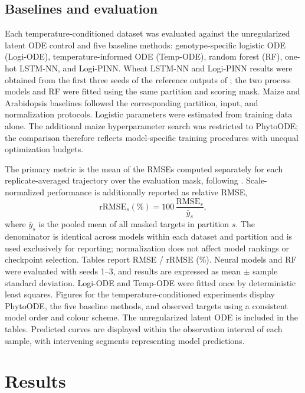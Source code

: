\documentclass[preprint,12pt,authoryear]{elsarticle}
\begin{document}
\subsection{Baselines and evaluation}

Each temperature-conditioned dataset was evaluated against the unregularized latent ODE control and five baseline methods: genotype-specific logistic ODE (Logi-ODE), temperature-informed ODE (Temp-ODE), random forest (RF), one-hot LSTM-NN, and Logi-PINN. Wheat LSTM-NN and Logi-PINN results were obtained from the first three seeds of the reference outputs of \citet{shao2026pinn}; the two process models and RF were fitted using the same partition and scoring mask. Maize and Arabidopsis baselines followed the corresponding partition, input, and normalization protocols. Logistic parameters were estimated from training data alone. The additional maize hyperparameter search was restricted to PhytoODE; the comparison therefore reflects model-specific training procedures with unequal optimization budgets.

The primary metric is the mean of the RMSEs computed separately for each replicate-averaged trajectory over the evaluation mask, following \citet{shao2026pinn}. Scale-normalized performance is additionally reported as relative RMSE,
\begin{equation}
 \mathrm{rRMSE}_s(\%)=100\,\frac{\mathrm{RMSE}_s}{\bar y_s},
 \label{eq:rrmse}
\end{equation}
where $\bar y_s$ is the pooled mean of all masked targets in partition $s$. The denominator is identical across models within each dataset and partition and is used exclusively for reporting; normalization does not affect model rankings or checkpoint selection. Tables report RMSE / rRMSE (\%). Neural models and RF were evaluated with seeds 1--3, and results are expressed as mean $\pm$ sample standard deviation. Logi-ODE and Temp-ODE were fitted once by deterministic least squares. Figures for the temperature-conditioned experiments display PhytoODE, the five baseline methods, and observed targets using a consistent model order and colour scheme. The unregularized latent ODE is included in the tables. Predicted curves are displayed within the observation interval of each sample, with intervening segments representing model predictions.




\section{Results}
\label{sec:results}
\end{document}
